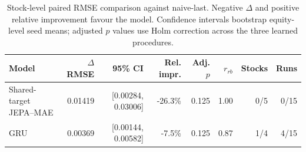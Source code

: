 \begin{table}[t]
\centering
\small
\caption{Stock-level paired RMSE comparison against naive-last. Negative $\Delta$ and positive relative improvement favour the model. Confidence intervals bootstrap equity-level seed means; adjusted $p$ values use Holm correction across the three learned procedures.}
\label{tab:paired_rmse_naive}
\begin{tabular}{lrrrrrrr}
\toprule
Model & $\Delta$RMSE & 95\% CI & Rel. impr. & Adj. $p$ & $r_{rb}$ & Stocks & Runs \\
\midrule
Shared-target JEPA--MAE & 0.01419 & [0.00284, 0.03006] & -26.3\% & 0.125 & 1.00 & 0/5 & 0/15 \\
GRU & 0.00369 & [0.00144, 0.00582] & -7.5\% & 0.125 & 0.87 & 1/4 & 4/15 \\
\bottomrule
\end{tabular}
\end{table}
